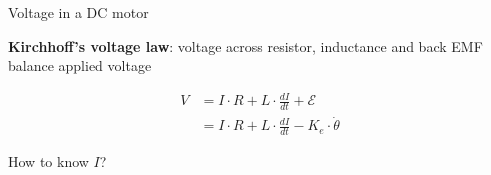 \documentclass[compress]{beamer}
\begin{document}
\begin{frame}{Voltage in a DC motor}

    \begin{center}
    \end{center}

\textbf{Kirchhoff's voltage law}: voltage across resistor, inductance and
back EMF balance applied voltage

\begin{align*}
    V &= I \cdot R + L \cdot \frac{dI}{dt} + \mathcal{E} \\
      &= I \cdot R + L \cdot \frac{dI}{dt} - K_e \cdot \dot\theta
\end{align*}

\pause

How to know $I$?

\end{frame}
\end{document}
